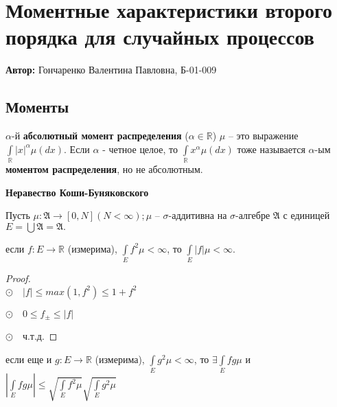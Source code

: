 
\section{Моментные характеристики второго порядка для случайных процессов}

\textbf{Автор:} Гончаренко Валентина Павловна, Б-01-009

\subsection{Моменты}
\cite{ShamarovDRP11} $\alpha$-й \textbf{абсолютный момент распределения} ($\alpha \in \mathds{R}$) $\mu$ -- это выражение $\int\limits_{\mathds{R}}^{} |x|^\alpha \mu(dx)$. Если $\alpha$ - четное целое, то $\int\limits_{\mathds{R}}^{} x^\alpha \mu(dx)$ тоже называется $\alpha$-ым \textbf{моментом распределения}, но не абсолютным.

\begin{center}
\textbf{Неравество Коши-Буняковского}    
\end{center}

Пусть $\mu: \mathfrak{A} \rightarrow [0,N] (N < \infty); \mu$ -- $\sigma$-аддитивна на $\sigma$-алгебре $\mathfrak{A}$ с единицей $E = \bigcup \mathfrak{A} = \mathfrak{A}.$

\begin{proposition} если $f: E \rightarrow \mathds{R}$ (измерима), $\int\limits_{E}^{} f^2 \mu < \infty$, то $\int\limits_{E}^{} |f| \mu < \infty$.
\end{proposition}

\begin{proof} 
\ \\
\indent$\odot\quad|f| \leqslant max (1, f^2) \leqslant 1 + f^2$ 

$\odot\quad0 \leqslant f_{\pm} \leqslant |f|$

$\odot\quad \text{ч.т.д.}$
\end{proof}

\begin{proposition} если еще и $g: E \rightarrow \mathds{R}$ (измерима), $\int\limits_{E}^{} g^2 \mu < \infty$, то $ \exists \int\limits_{E}^{} fg \mu$ и $|\int\limits_{E}^{} fg \mu| \leqslant \sqrt{\int\limits_{E}^{} f^2 \mu} \sqrt{\int\limits_{E}^{} g^2 \mu}$ 
\end{proposition}

